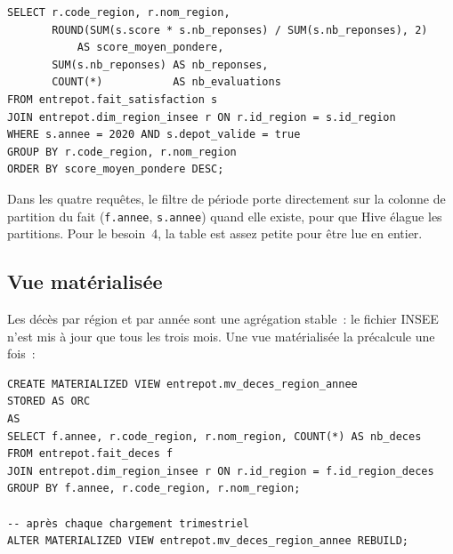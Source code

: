 \begin{center}
\begin{minipage}{0.92\textwidth}
\begin{tcolorbox}[colback=title2!6,colframe=title1,boxsep=2pt]
\begin{verbatim}
SELECT r.code_region, r.nom_region,
       ROUND(SUM(s.score * s.nb_reponses) / SUM(s.nb_reponses), 2)
           AS score_moyen_pondere,
       SUM(s.nb_reponses) AS nb_reponses,
       COUNT(*)           AS nb_evaluations
FROM entrepot.fait_satisfaction s
JOIN entrepot.dim_region_insee r ON r.id_region = s.id_region
WHERE s.annee = 2020 AND s.depot_valide = true
GROUP BY r.code_region, r.nom_region
ORDER BY score_moyen_pondere DESC;
\end{verbatim}
\end{tcolorbox}
\end{minipage}
\end{center}

\noindent Dans les quatre requêtes, le filtre de période porte directement sur la colonne de partition du fait (\texttt{f.annee}, \texttt{s.annee}) quand elle existe, pour que Hive élague les partitions. Pour le besoin~4, la table est assez petite pour être lue en entier.

\subsection{Vue matérialisée}

\noindent Les décès par région et par année sont une agrégation stable~: le fichier INSEE n'est mis à jour que tous les trois mois. Une vue matérialisée la précalcule une fois~:

\begin{center}
\begin{minipage}{0.92\textwidth}
\begin{tcolorbox}[colback=title2!6,colframe=title1,boxsep=2pt]
\begin{verbatim}
CREATE MATERIALIZED VIEW entrepot.mv_deces_region_annee
STORED AS ORC
AS
SELECT f.annee, r.code_region, r.nom_region, COUNT(*) AS nb_deces
FROM entrepot.fait_deces f
JOIN entrepot.dim_region_insee r ON r.id_region = f.id_region_deces
GROUP BY f.annee, r.code_region, r.nom_region;

-- après chaque chargement trimestriel
ALTER MATERIALIZED VIEW entrepot.mv_deces_region_annee REBUILD;
\end{verbatim}
\end{tcolorbox}
\end{minipage}
\end{center}

